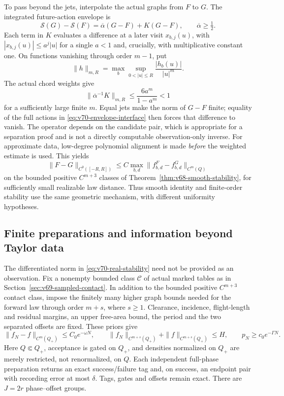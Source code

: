 To pass beyond the jets, interpolate the actual graphs from $F$ to $G$.
The integrated future-action envelope is
\begin{equation}\label{eq:v70-envelope-interface}
 \mathcal S(G)-\mathcal S(F)=\overline\alpha(G-F)+K(G-F),
 \qquad \overline\alpha\ge\tfrac12.
\end{equation}
Each term in $K$ evaluates a difference at a later visit
$x_{b,j}(u)$, with $|x_{b,j}(u)|\le a^j|u|$ for a single $a<1$
and, crucially, with multiplicative constant one.  On functions vanishing
through order $m-1$, put
\[
 \|h\|_{m,R}=\max_b\sup_{0<|u|\le R}\frac{|h_b(u)|}{|u|^m}.
\]
The actual chord weights give
\begin{equation}\label{eq:v70-tail}
 \|\overline\alpha^{-1}K\|_{m,R}
        \le\frac{6a^m}{1-a^m}<1
\end{equation}
for a sufficiently large finite $m$.  Equal jets make the norm of $G-F$
finite; equality of the full actions in
\eqref{eq:v70-envelope-interface} then forces that difference to vanish.
The operator depends on the candidate pair, which is appropriate for a
separation proof and is not a directly computable observation-only
inverse.  For approximate data, low-degree polynomial alignment is made
\emph{before} the weighted estimate is used.  This yields
\begin{equation}\label{eq:v70-real-stability}
 \|F-G\|_{C^0([-R,R])}\le
 C\max_{b,d}\|f^F_{b,d}-f^G_{b,d}\|_{C^m(Q)}
\end{equation}
on the bounded positive $C^{m+3}$ classes of
Theorem~\ref{thm:v68-smooth-stability}, for sufficiently small realizable
law distance.  Thus smooth identity and finite-order stability use the
same geometric mechanism, with different uniformity hypotheses.

\subsection{Finite preparations and information beyond Taylor data}

The differentiated norm in \eqref{eq:v70-real-stability} need not be
provided as an observation.  Fix a nonempty bounded class $\mathscr C$
of actual marked tables as in Section~\ref{sec:v69-sampled-contact}.
In addition to the bounded positive $C^{m+3}$ contact class, impose the
finitely many higher graph bounds needed for the forward law through
order $m+s$, where $s\ge1$.  Clearance, incidence, flight-length and
residual margins, an upper free-area bound, the period and the two
separated offsets are fixed.  These priors give
\[
 \|f_N-f\|_{C^m(Q_+)}\le C_0e^{-\omega N},\qquad
 \|f_N\|_{C^{m+s}(Q_+)}+\|f\|_{C^{m+s}(Q_+)}\le H,
 \qquad p_N\ge c_0e^{-\Gamma N}.
\]
Here $Q\Subset Q_+$, acceptance is gated on $Q_+$, and densities
normalized on $Q_+$ are merely restricted, not renormalized, on $Q$.
Each independent full-phase preparation returns an exact success/failure
tag and, on success, an endpoint pair with recording error at most
$\delta$.  Tags, gates and offsets remain exact.  There are $J=2r$
phase--offset groups.

